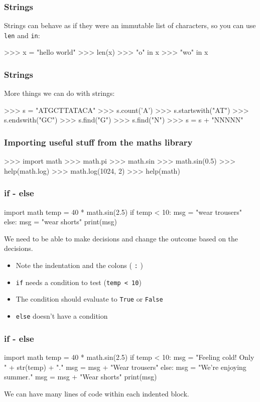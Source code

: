 \documentclass{beamer}
\begin{document}
\begin{frame}[fragile]
\frametitle{Strings}
Strings can behave as if they were an immutable list of characters, so
you can use {\tt len} and {\tt in}: 
\begin{code}
>>> x = "hello world"
>>> len(x)
>>> "o" in x
>>> "wo" in x
\end{code}
\end{frame}


\begin{frame}[fragile]
\frametitle{Strings}

More things we can do with strings:
\begin{code}
>>> s = "ATGCTTATACA"
>>> s.count('A')
>>> s.startswith("AT")
>>> s.endswith("GC")
>>> s.find("G")
>>> s.find("N")
>>> s = s + "NNNNN"
\end{code}
\end{frame}

\begin{frame}[fragile]
\frametitle{Importing useful stuff from the maths library}
\begin{code}
>>> import math
>>> math.pi
>>> math.sin
>>> math.sin(0.5) 
>>> help(math.log)
>>> math.log(1024, 2)
>>> help(math)
\end{code}
\end{frame}

\begin{frame}[fragile]
\frametitle{if - else}
\begin{code}
import math
temp = 40 * math.sin(2.5)
if temp < 10:
   msg = "wear trousers"
else:
   msg = "wear shorts"
print(msg)
\end{code}
We need to be able to make decisions and change the
outcome based on the decisions.
\begin{itemize}
\item Note the indentation and the colons ( {\tt :} )
\item {\tt if} needs a condition to test ({\tt temp < 10})
\item The condition should evaluate to {\tt True} or {\tt False}
\item {\tt else} doesn't have a condition
\end{itemize}
\end{frame}

\begin{frame}[fragile]
\frametitle{if - else}
\begin{code}
import math
temp = 40 * math.sin(2.5)
if temp < 10:
   msg = "Feeling cold! Only " + str(temp) + "."
   msg = msg + "Wear trousers"
else:
   msg = "We're enjoying summer."
   msg = msg + "Wear shorts"
print(msg)
\end{code}
We can have many lines of code within each indented
block.
\end{frame}
\end{document}
